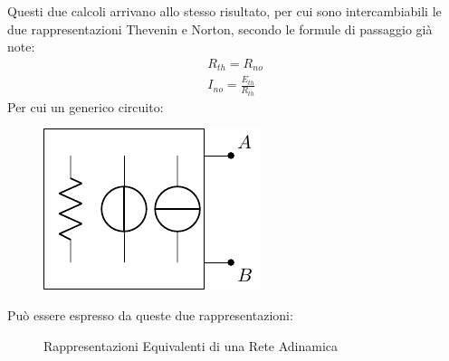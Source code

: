 \documentclass{article}
\numberwithin{equation}{subsection}
\begin{document}
Questi due calcoli arrivano allo stesso risultato, per cui sono intercambiabili le due rappresentazioni 
Thevenin e Norton, secondo le formule di passaggio già note:
\begin{gather*}
    R_{th}=R_{no}\\
    I_{no}=\displaystyle\frac{E_{th}}{R_{th}}
\end{gather*} 
Per cui un generico circuito:
\begin{figure}[H]%
    \centering
    \includegraphics{rete-adinamica-generica.pdf}
\end{figure}
Può essere espresso da queste due rappresentazioni:
\begin{figure}[H]%
    \centering
    \qquad
    \caption{Rappresentazioni Equivalenti di una Rete Adinamica}
    \label{fig:rappresentazioni-equivalenti}
\end{figure}
\end{document}
